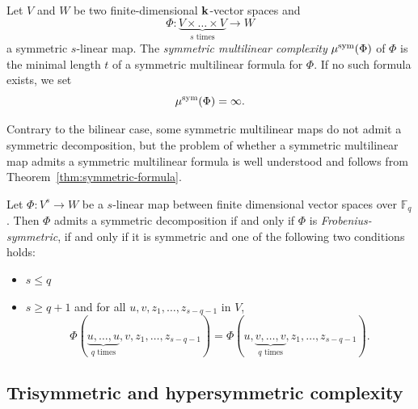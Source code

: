 \begin{defi}
Let $V$ and $W$ be two finite-dimensional $\mathbf{k}$-vector
spaces and
\[
  \Phi:\underset{\textrm{$s$ times}}{\underbrace{V\times\dots\times V}}\to W
\]
a symmetric $s$-linear map. The \emph{symmetric multilinear complexity} $\mu^{\textrm{sym}}(\Phi)$ of $\Phi$ is the
minimal length $t$ of a symmetric multilinear formula for $\Phi$. If no such
formula exists, we set
\[
  \mu^{\textrm{sym}}(\Phi) = \infty.
\]
\end{defi}
Contrary to the bilinear case, some symmetric multilinear maps do not admit a symmetric
decomposition, but the problem of whether a symmetric multilinear map admits
a symmetric multilinear formula is well understood and follows from
Theorem~\ref{thm:symmetric-formula}.
\begin{thm}\label{th:criterion}
\label{thm:symmetric-formula}
Let $\Phi:V^s\to W$ be a $s$-linear map between finite dimensional vector spaces over $\mathbb{F}_q$.
Then $\Phi$ admits a symmetric decomposition if and only if $\Phi$ is \emph{Frobenius-symmetric},
\ie if and only if it is symmetric and one of the following two conditions holds:
\begin{itemize}
\item $s\leq q$
\item $s\geq q+1$ and for all $u,v,z_1,\dots,z_{s-q-1}$ in $V$,
\[
\Phi(\underset{\textrm{$q$ times}}{\underbrace{u,\dots,u}},v,z_1,\dots,z_{s-q-1})=\Phi(u,\underset{\textrm{$q$ times}}{\underbrace{v,\dots,v}},z_1,\dots,z_{s-q-1}).
\]
\end{itemize}
\end{thm}

\subsection{Trisymmetric and hypersymmetric complexity}
\label{subsec:trisym}

